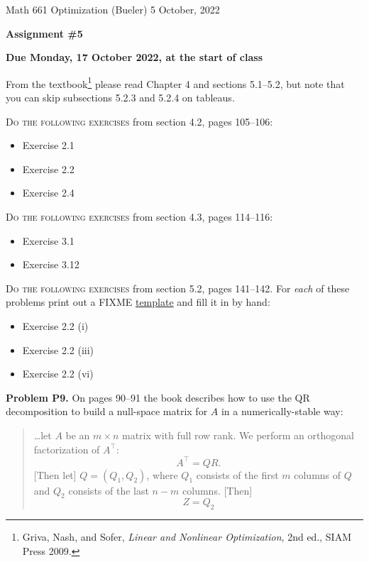 \documentclass[12pt]{amsart}
\newcommand{\prob}[1]{\bigskip\noindent\textbf{#1}\quad }
\begin{document}
\scriptsize \noindent Math 661 Optimization (Bueler) \hfill 5 October, 2022
\normalsize

\medskip\bigskip

\Large\centerline{\textbf{Assignment \#5}}
\large
\bigskip

\centerline{\textbf{Due Monday, 17 October 2022, at the start of class}}
\bigskip
\normalsize

\thispagestyle{empty}

\bigskip
From the textbook\footnote{Griva, Nash, and Sofer, \emph{Linear and Nonlinear Optimization}, 2nd ed., SIAM Press 2009.} please read Chapter 4 and sections 5.1--5.2, but note that you can skip subsections 5.2.3 and 5.2.4 on tableaus.

\bigskip
\noindent \textsc{Do the following exercises} from section 4.2, pages 105--106:

\begin{itemize}
\item Exercise 2.1
\item Exercise 2.2
\item Exercise 2.4
\end{itemize}

\bigskip
\noindent \textsc{Do the following exercises} from section 4.3, pages 114--116:

\begin{itemize}
\item Exercise 3.1
\item Exercise 3.12
\end{itemize}

\bigskip
\noindent \textsc{Do the following exercises} from section 5.2, pages 141--142.  For \emph{each} of these problems print out a FIXME \href{FIXME}{template} and fill it in by hand:

\begin{itemize}
\item Exercise 2.2 (i)
\item Exercise 2.2 (iii)
\item Exercise 2.2 (vi)
\end{itemize}


\prob{Problem P9.}  On pages 90--91 the book describes how to use the QR decomposition to build a null-space matrix for $A$ in a numerically-stable way:

\begin{quote}
\dots let $A$ be an $m\times n$ matrix with full row rank.  We perform an orthogonal factorization of $A^\top$:
    $$A^\top = QR.$$
[Then let] $Q=(Q_1,Q_2)$, where $Q_1$ consists of the first $m$ columns of $Q$ and $Q_2$ consists of the last $n-m$ columns.  [Then]
    $$Z = Q_2$$
\end{quote}
\end{document}
